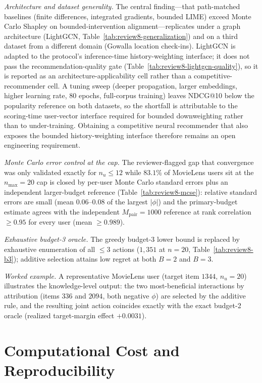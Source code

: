 \documentclass[a4paper,fleqn,doubleblind]{cas-sc}
\begin{document}
\emph{Architecture and dataset generality.} The central finding---that
path-matched baselines (finite differences, integrated gradients, bounded
LIME) exceed Monte Carlo Shapley on bounded-intervention alignment---replicates
under a graph architecture (LightGCN, Table~\ref{tab:review8-generalization})
and on a third dataset from a different domain (Gowalla location check-ins).
LightGCN is adapted to the protocol's inference-time history-weighting
interface; it does not pass the recommendation-quality gate
(Table~\ref{tab:review8-lightgcn-quality}), so it is reported as an
architecture-applicability cell rather than a competitive-recommender cell.
A tuning sweep (deeper propagation, larger embeddings, higher learning rate,
80 epochs, full-corpus training) leaves NDCG@10 below the popularity
reference on both datasets, so the shortfall is attributable to the
scoring-time user-vector interface required for bounded downweighting rather
than to under-training. Obtaining a competitive neural recommender that also
exposes the bounded history-weighting interface therefore remains an open
engineering requirement.

\emph{Monte Carlo error control at the cap.} The reviewer-flagged gap that
convergence was only validated exactly for $n_u\le12$ while $83.1\%$ of
MovieLens users sit at the $n_{\max}=20$ cap is closed by per-user Monte Carlo
standard errors plus an independent larger-budget reference
(Table~\ref{tab:review8-mcse}): relative standard errors are small (mean
$0.06$--$0.08$ of the largest $|\phi|$) and the primary-budget estimate agrees
with the independent $M_{\mathrm{pair}}=1000$ reference at rank correlation
$\ge0.95$ for every user (mean $\ge0.989$).

\emph{Exhaustive budget-3 oracle.} The greedy budget-3 lower bound is replaced
by exhaustive enumeration of all $\le3$ actions ($1{,}351$ at $n=20$,
Table~\ref{tab:review8-b3}); additive selection attains low regret at both
$B=2$ and $B=3$.

\emph{Worked example.} A representative MovieLens user (target item $1344$,
$n_u=20$) illustrates the knowledge-level output: the two most-beneficial
interactions by attribution (items $336$ and $2094$, both negative $\phi$) are
selected by the additive rule, and the resulting joint action coincides exactly
with the exact budget-2 oracle (realized target-margin effect $+0.0031$).

\FloatBarrier
\clearpage

\clearpage
\section{Computational Cost and Reproducibility}\label{app:release}

\FloatBarrier
\clearpage
\end{document}
